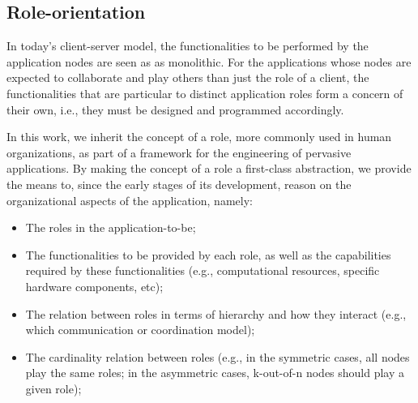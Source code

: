 


\subsection{Role-orientation}


In today's client-server model, the functionalities to be performed by the application nodes are seen as as monolithic. For the applications whose nodes are expected to collaborate and play others than just the role of a client, the functionalities that are particular to distinct application roles form a concern of their own, i.e., they must be designed and programmed accordingly. 

In this work, we inherit the concept of a role, more commonly used in human organizations, as part of a framework for the engineering of pervasive applications. By making the concept of a role a first-class abstraction, we provide the means to, since the early stages of its development, reason on the organizational aspects of the application, namely:

\begin{itemize}
	
	\item The roles in the application-to-be;
	
	\item The functionalities to be provided by each role, as well as the capabilities required by these functionalities (e.g., computational resources, specific hardware components, etc); 
	
	\item The relation between roles in terms of hierarchy and how they interact (e.g., which communication or coordination model);
	
	\item The cardinality relation between roles (e.g., in the symmetric cases, all nodes play the same roles; in the asymmetric cases, k-out-of-n nodes should play a given role);	
	
\end{itemize}

